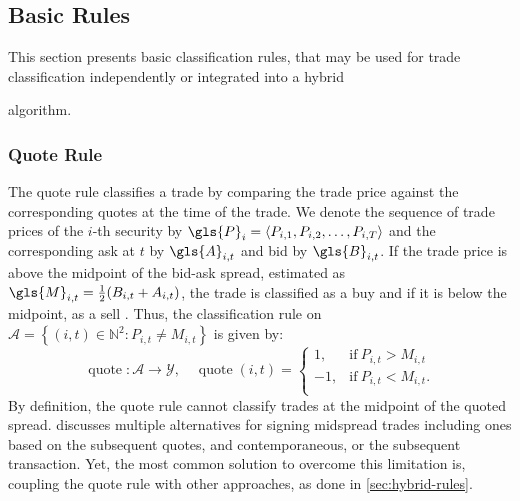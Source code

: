 \subsection{Basic Rules}\label{sec:basic-rules}

This section presents basic classification rules, that may be used for trade classification independently or integrated into a hybrid

 algorithm.

\subsubsection{Quote Rule}\label{sec:quote-rule}


The quote rule classifies a trade by comparing the trade price against the corresponding quotes at the time of the trade. We denote the sequence of trade prices of the $i$-th security by $\gls{P}_i = \langle P_{i,1},P_{i,2},\dots,P_{i,T}\rangle$ and the corresponding ask at $t$ by $\gls{A}_{i,t}$ and bid by $\gls{B}_{i,t}$. If the trade price is above the midpoint of the bid-ask spread, estimated as $\gls{M}_{i,t} = \tfrac{1}{2}(B_{i,t} + A_{i,t})$, the trade is classified as a buy and if it is below the midpoint, as a sell \autocite[][41]{harrisDayEndTransactionPrice1989}. Thus, the classification rule on $\mathcal{A} = \left\{(i, t) \in \mathbb{N}^2: P_{i,t} \neq M_{i,t}\right\}$ is given by:
\begin{equation}
    \operatorname{quote}\colon \mathcal{A} \to \mathcal{Y},\quad
    \operatorname{quote}(i, t)=
    \begin{cases}
        1,  & \mathrm{if}\ P_{i, t}>M_{i, t}  \\
        -1, & \mathrm{if}\ P_{i, t}<M_{i, t}. \\
    \end{cases}
\end{equation}
By definition, the quote rule cannot classify trades at the midpoint of the quoted spread. \textcite[][241]{hasbrouckTradesQuotesInventories1988} discusses multiple alternatives for signing midspread trades including ones based on the subsequent quotes, and contemporaneous, or the subsequent transaction. Yet, the most common solution to overcome this limitation is, coupling the quote rule with other approaches, as done in \cref{sec:hybrid-rules}.


